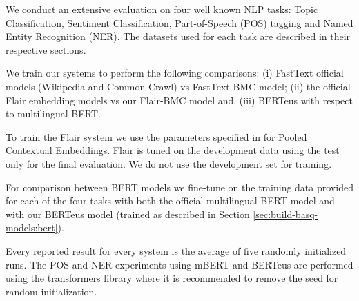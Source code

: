 \documentclass[10pt, a4paper]{article}
\begin{document}







We conduct an extensive evaluation on four well known NLP tasks: Topic Classification, Sentiment Classification, Part-of-Speech (POS) tagging and Named Entity Recognition (NER). The datasets used for each task are described in their respective sections.

We train our systems to perform the following comparisons: (i) FastText official models (Wikipedia and Common Crawl) vs FastText-BMC model; (ii) the official Flair embedding models vs our Flair-BMC model and, (iii) BERTeus with respect to multilingual BERT.

To train the Flair system we use the parameters specified in \cite{akbik2019naacl} for Pooled Contextual Embeddings. Flair is tuned on the development data using the test only for the final evaluation. We do not use the development set for training.

For comparison between BERT models we fine-tune on the training data provided for each of the four tasks with both the official multilingual BERT \cite{devlin2019bert} model and with our BERTeus model (trained as described in Section \ref{sec:build-basq-models:bert}).

Every reported result for every system is the average of five randomly initialized runs. The POS and NER experiments using mBERT and BERTeus are performed using the transformers library  where it is recommended to remove the seed for random initialization.
\end{document}
